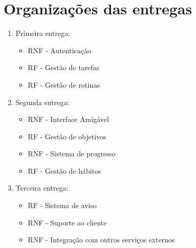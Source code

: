 \chapter{Organizações das entregas}

\begin{enumerate}
  \item Primeira entrega:

  \begin{itemize}
    \item{RNF - Autenticação}
    \item{RF - Gestão de tarefas}
    \item{RF - Gestão de rotinas}
  \end{itemize}

  \item Segunda entrega:

  \begin{itemize}
    \item{RNF - Interface Amigável}
    \item{RF - Gestão de objetivos}
    \item{RNF - Sistema de progresso}
    \item{RF - Gestão de hábitos}
  \end{itemize}

  \item Terceira entrega:

  \begin{itemize}
    \item{RF - Sistema de aviso}
    \item{RNF - Suporte ao cliente}
    \item{RNF - Integração com outros serviços externos}
  \end{itemize}
\end{enumerate}
